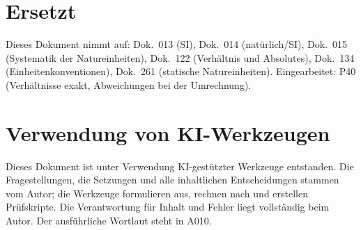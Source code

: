 \section{Ersetzt}

Dieses Dokument nimmt auf: Dok.~013 (SI), Dok.~014 (natürlich/SI), Dok.~015
(Systematik der Natureinheiten), Dok.~122 (Verhältnis und Absolutes), Dok.~134
(Einheitenkonventionen), Dok.~261 (statische Natureinheiten). Eingearbeitet: P40 (Verhältnisse exakt, Abweichungen bei der Umrechnung).

\section{Verwendung von KI-Werkzeugen}

Dieses Dokument ist unter Verwendung KI-gestützter Werkzeuge entstanden. Die
Fragestellungen, die Setzungen und alle inhaltlichen Entscheidungen stammen vom
Autor; die Werkzeuge formulieren aus, rechnen nach und erstellen Prüfskripte.
Die Verantwortung für Inhalt und Fehler liegt vollständig beim Autor. Der
ausführliche Wortlaut steht in A010.
